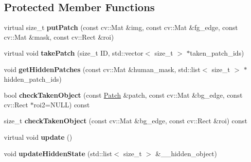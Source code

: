 \subsection*{Protected Member Functions}
\begin{DoxyCompactItemize}
\item 
\hypertarget{classskl_1_1_patch_model_ad7905ca278a70e87cceaad2ff2273b6f}{}\label{classskl_1_1_patch_model_ad7905ca278a70e87cceaad2ff2273b6f} 
virtual size\+\_\+t {\bfseries put\+Patch} (const cv\+::\+Mat \&img, const cv\+::\+Mat \&fg\+\_\+edge, const cv\+::\+Mat \&mask, const cv\+::\+Rect \&roi)
\item 
\hypertarget{classskl_1_1_patch_model_a1b4c7a5c43d539c98244bdab51879f59}{}\label{classskl_1_1_patch_model_a1b4c7a5c43d539c98244bdab51879f59} 
virtual void {\bfseries take\+Patch} (size\+\_\+t ID, std\+::vector$<$ size\+\_\+t $>$ $\ast$taken\+\_\+patch\+\_\+ids)
\item 
\hypertarget{classskl_1_1_patch_model_aa0b071c51878060ea7f542279ea9d741}{}\label{classskl_1_1_patch_model_aa0b071c51878060ea7f542279ea9d741} 
void {\bfseries get\+Hidden\+Patches} (const cv\+::\+Mat \&human\+\_\+mask, std\+::list$<$ size\+\_\+t $>$ $\ast$hidden\+\_\+patch\+\_\+ids)
\item 
\hypertarget{classskl_1_1_patch_model_ae461451d928d786f2b1a6859b7acae43}{}\label{classskl_1_1_patch_model_ae461451d928d786f2b1a6859b7acae43} 
bool {\bfseries check\+Taken\+Object} (const \hyperlink{classskl_1_1_patch}{Patch} \&patch, const cv\+::\+Mat \&bg\+\_\+edge, const cv\+::\+Rect $\ast$roi2=N\+U\+LL) const
\item 
\hypertarget{classskl_1_1_patch_model_a78a7921db7d860b04b3d074625070272}{}\label{classskl_1_1_patch_model_a78a7921db7d860b04b3d074625070272} 
size\+\_\+t {\bfseries check\+Taken\+Object} (const cv\+::\+Mat \&bg\+\_\+edge, const cv\+::\+Rect \&roi) const
\item 
\hypertarget{classskl_1_1_patch_model_a72bcc7c60cc145286066eae25428773b}{}\label{classskl_1_1_patch_model_a72bcc7c60cc145286066eae25428773b} 
virtual void {\bfseries update} ()
\item 
\hypertarget{classskl_1_1_patch_model_a52e5eb73c87a149455cecc3f9a0e2a82}{}\label{classskl_1_1_patch_model_a52e5eb73c87a149455cecc3f9a0e2a82} 
void {\bfseries update\+Hidden\+State} (std\+::list$<$ size\+\_\+t $>$ \&\+\_\+\+\_\+hidden\+\_\+object)
\end{DoxyCompactItemize}
